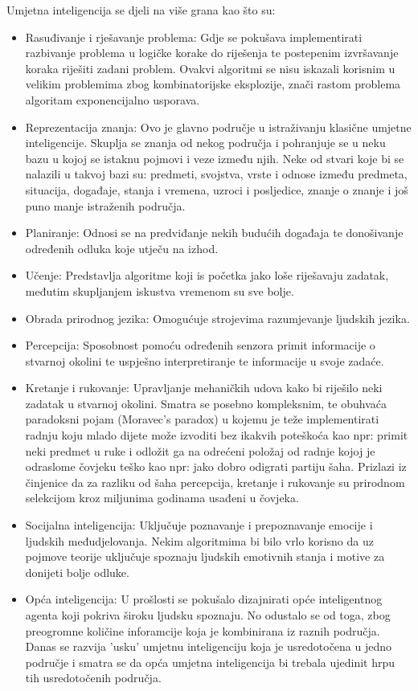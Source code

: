 Umjetna inteligencija se djeli na više grana kao što su:
\begin{itemize}
	\item Rasuđivanje i rješavanje problema: Gdje se pokušava implementirati razbivanje problema u logičke korake do riješenja te postepenim izvršavanje koraka riješiti zadani problem. Ovakvi algoritmi se nisu iskazali korisnim u velikim problemima zbog kombinatorijske eksplozije, znači rastom problema algoritam exponencijalno usporava.
	
	\item Reprezentacija znanja: Ovo je glavno područje u istraživanju klasične umjetne inteligencije. Skuplja se znanja od nekog područja i pohranjuje se u neku bazu u kojoj se istaknu pojmovi i veze između njih. Neke od stvari koje bi se nalazili u takvoj bazi su: predmeti, svojstva, vrste i odnose između predmeta, situacija, događaje, stanja i vremena, uzroci i posljedice, znanje o znanje i još puno manje istraženih područja.
	
	\item Planiranje: Odnosi se na predviđanje nekih budućih događaja te donošivanje određenih odluka koje utječu na izhod.
	
	\item Učenje: Predstavlja algoritme koji is početka jako loše riješavaju zadatak, međutim skupljanjem iskustva vremenom su sve bolje.
	
	\item Obrada prirodnog jezika: Omogućuje strojevima razumjevanje ljudskih jezika.
	
	\item Percepcija: Sposobnost pomoću određenih senzora primit informacije o stvarnoj okolini te uspješno interpretiranje te informacije u svoje zadaće.
	
	\item Kretanje i rukovanje: Upravljanje mehaničkih udova kako bi riješilo neki zadatak u stvarnoj okolini. Smatra se posebno kompleksnim, te obuhvaća paradoksni pojam (Moravec's paradox) u kojemu je teže implementirati radnju koju mlado dijete može izvoditi bez ikakvih poteškoća kao npr: primit neki predmet u ruke i odložit ga na odrećeni položaj od radnje kojoj je odraslome čovjeku teško kao npr: jako dobro odigrati partiju šaha. Prizlazi iz činjenice da za razliku od šaha percepcija, kretanje i rukovanje su prirodnom selekcijom kroz miljunima godinama usađeni u čovjeka.
	
	\item Socijalna inteligencija: Uključuje poznavanje i prepoznavanje emocije i ljudskih međudjelovanja. Nekim algoritmima bi bilo vrlo korisno da uz pojmove teorije uključuje spoznaju ljudskih emotivnih stanja i motive za donijeti bolje odluke.
	
	\item Opća inteligencija: U prošlosti se pokušalo dizajnirati opće inteligentnog agenta koji pokriva široku ljudsku spoznaju. No odustalo se od toga, zbog preogromne količine inforamcije koja je kombinirana iz raznih područja. Danas se razvija 'usku' umjetnu inteligenciju koja je usredotočena u jedno područje i smatra se da opća umjetna inteligencija bi trebala ujedinit hrpu tih usredotočenih područja.
\end{itemize}

